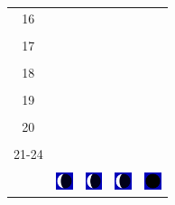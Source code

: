 \documentclass[a4paper,12pt, tikz]{scrartcl}
\begin{document}
\begin{tabularx}{\linewidth}{|c|X|X|p{2cm}|p{2cm}|}
            &   &       &    &   \\
          \hline
          16&   &                 &    &   \\
            &   &       &    &   \\
          \hline
          17&   &                 &    &   \\
            &   &       &    &   \\
          \hline
          18&   &                 &    &   \\
            &   &       &    &   \\
          \hline
          19&   &                 &     &   \\
            &   &       &    &   \\
          \hline
          20&   &              &    &   \\
            &   &       &    &   \\
          \hline 
          21-24&   &              &    &   \\
            &   &       &    &   \\
          \hline
                      & \vspace{0.01cm} \centerline{\includegraphics[width=0.5cm]{moon_phases/Moon_phase_7.svg.png}} \vspace{0.1cm} & \vspace{0.01cm} \centerline{\includegraphics[width=0.5cm]{moon_phases/Moon_phase_7.svg.png}} \vspace{0.1cm} & \vspace{0.01cm} \centerline{\includegraphics[width=0.5cm]{moon_phases/Moon_phase_7.svg.png}} \vspace{0.1cm} & \vspace{0.01cm} \centerline{\includegraphics[width=0.5cm]{moon_phases/Moon_phase_0.svg.png}} \vspace{0.1cm}\\
          \hline    
        \end{tabularx}
\end{document}
